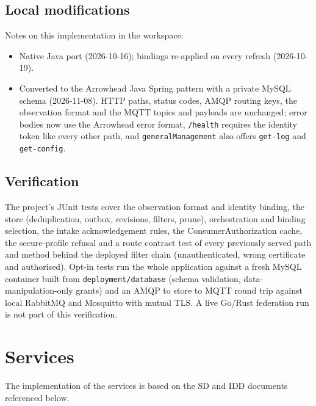 \documentclass[a4paper]{arrowhead}
\begin{document}
\subsection{Local modifications}
\label{sec:local}

Notes on this implementation in the workspace:
\begin{itemize}
  \item Native Java port (2026-10-16); bindings re-applied on every refresh (2026-10-19).
  \item Converted to the Arrowhead Java Spring pattern with a private MySQL schema (2026-11-08). HTTP paths, status codes, AMQP routing keys, the observation format and the MQTT topics and payloads are unchanged; error bodies now use the Arrowhead error format, \texttt{/health} requires the identity token like every other path, and \texttt{generalManagement} also offers \texttt{get-\allowbreak{}log} and \texttt{get-\allowbreak{}config}.
\end{itemize}

\subsection{Verification}

The project's JUnit tests cover the observation format and identity binding, the store (deduplication, outbox, revisions, filters, prune), orchestration and binding selection, the intake acknowledgement rules, the ConsumerAuthorization cache, the secure-profile refusal and a route contract test of every previously served path and method behind the deployed filter chain (unauthenticated, wrong certificate and authorised). Opt-in tests run the whole application against a fresh MySQL container built from \texttt{deployment/\allowbreak{}database} (schema validation, data-manipulation-only grants) and an AMQP to store to MQTT round trip against local RabbitMQ and Mosquitto with mutual TLS. A live Go/Rust federation run is not part of this verification.

\newpage

\section{Services}
\label{sec:services}

The implementation of the services is based on the SD and IDD documents referenced below.
\end{document}
